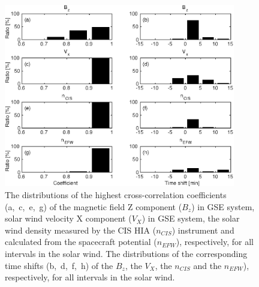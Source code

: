 \documentclass[draft]{agujournal2019}
\begin{document}
\begin{figure}[h]
\centering
\includegraphics[width=0.9\textwidth,angle=0]{swe-2021sw002807-f05} 
\caption{The distributions of the highest cross-correlation coefficients (a,~c,~e,~g) of the magnetic field Z component ($B_z$) in GSE system, solar wind velocity X component ($V_X$) in GSE system, the solar wind density measured by the CIS HIA ($n_{CIS}$) instrument and calculated from the spacecraft potential ($n_{EFW}$), respectively, for all intervals in the solar wind. The distributions of the corresponding time shifts (b,~d,~f,~h) of the $B_z$, the $V_X$, the $n_{CIS}$ and the $n_{EFW}$), respectively, for all intervals in the solar wind.}
\label{fig:swcorrplot}
\end{figure}

\pagebreak
\end{document}
